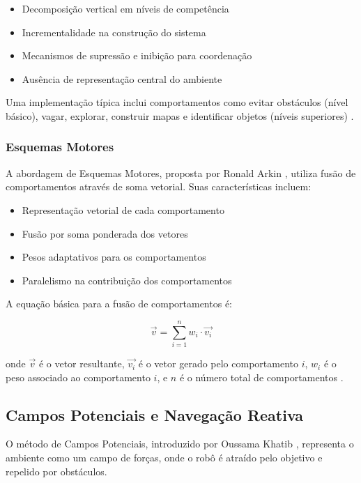 \begin{itemize}
    \item Decomposição vertical em níveis de competência
    \item Incrementalidade na construção do sistema
    \item Mecanismos de supressão e inibição para coordenação
    \item Ausência de representação central do ambiente
\end{itemize}

Uma implementação típica inclui comportamentos como evitar obstáculos (nível básico), vagar, explorar, construir mapas e identificar objetos (níveis superiores) \cite{Brooks1986}.

\subsubsection{Esquemas Motores}

A abordagem de Esquemas Motores, proposta por Ronald Arkin \cite{Arkin1989}, utiliza fusão de comportamentos através de soma vetorial. Suas características incluem:

\begin{itemize}
    \item Representação vetorial de cada comportamento
    \item Fusão por soma ponderada dos vetores
    \item Pesos adaptativos para os comportamentos
    \item Paralelismo na contribuição dos comportamentos
\end{itemize}

A equação básica para a fusão de comportamentos é:

\begin{equation}
\vec{v} = \sum_{i=1}^{n} w_i \cdot \vec{v_i}
\end{equation}

onde $\vec{v}$ é o vetor resultante, $\vec{v_i}$ é o vetor gerado pelo comportamento $i$, $w_i$ é o peso associado ao comportamento $i$, e $n$ é o número total de comportamentos \cite{Arkin1998}.

\subsection{Campos Potenciais e Navegação Reativa}

O método de Campos Potenciais, introduzido por Oussama Khatib \cite{Khatib1986}, representa o ambiente como um campo de forças, onde o robô é atraído pelo objetivo e repelido por obstáculos.

